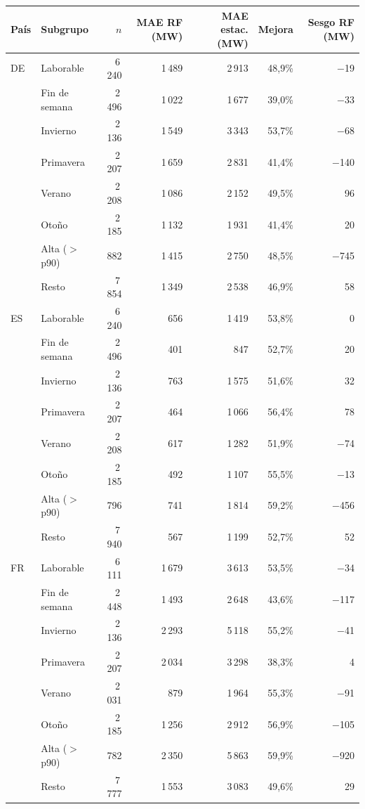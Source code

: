 \begin{tabular}{llrrrrr}
\toprule
País & Subgrupo & $n$ & MAE RF (MW) & MAE estac. (MW) & Mejora & Sesgo RF (MW) \\
\midrule
DE & Laborable & 6\,240 & 1\,489 & 2\,913 & 48{,}9\% & $-$19 \\
 & Fin de semana & 2\,496 & 1\,022 & 1\,677 & 39{,}0\% & $-$33 \\
 & Invierno & 2\,136 & 1\,549 & 3\,343 & 53{,}7\% & $-$68 \\
 & Primavera & 2\,207 & 1\,659 & 2\,831 & 41{,}4\% & $-$140 \\
 & Verano & 2\,208 & 1\,086 & 2\,152 & 49{,}5\% & 96 \\
 & Otoño & 2\,185 & 1\,132 & 1\,931 & 41{,}4\% & 20 \\
 & Alta ($>$ p90) & 882 & 1\,415 & 2\,750 & 48{,}5\% & $-$745 \\
 & Resto & 7\,854 & 1\,349 & 2\,538 & 46{,}9\% & 58 \\
\midrule
ES & Laborable & 6\,240 & 656 & 1\,419 & 53{,}8\% & 0 \\
 & Fin de semana & 2\,496 & 401 & 847 & 52{,}7\% & 20 \\
 & Invierno & 2\,136 & 763 & 1\,575 & 51{,}6\% & 32 \\
 & Primavera & 2\,207 & 464 & 1\,066 & 56{,}4\% & 78 \\
 & Verano & 2\,208 & 617 & 1\,282 & 51{,}9\% & $-$74 \\
 & Otoño & 2\,185 & 492 & 1\,107 & 55{,}5\% & $-$13 \\
 & Alta ($>$ p90) & 796 & 741 & 1\,814 & 59{,}2\% & $-$456 \\
 & Resto & 7\,940 & 567 & 1\,199 & 52{,}7\% & 52 \\
\midrule
FR & Laborable & 6\,111 & 1\,679 & 3\,613 & 53{,}5\% & $-$34 \\
 & Fin de semana & 2\,448 & 1\,493 & 2\,648 & 43{,}6\% & $-$117 \\
 & Invierno & 2\,136 & 2\,293 & 5\,118 & 55{,}2\% & $-$41 \\
 & Primavera & 2\,207 & 2\,034 & 3\,298 & 38{,}3\% & 4 \\
 & Verano & 2\,031 & 879 & 1\,964 & 55{,}3\% & $-$91 \\
 & Otoño & 2\,185 & 1\,256 & 2\,912 & 56{,}9\% & $-$105 \\
 & Alta ($>$ p90) & 782 & 2\,350 & 5\,863 & 59{,}9\% & $-$920 \\
 & Resto & 7\,777 & 1\,553 & 3\,083 & 49{,}6\% & 29 \\
\bottomrule
\end{tabular}